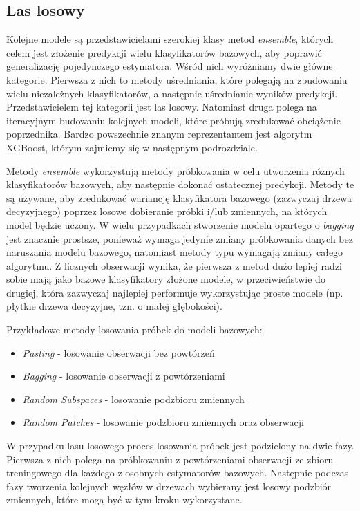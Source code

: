 \documentclass{book}
\begin{document}

\subsection{Las losowy}
	Kolejne modele są przedstawicielami szerokiej klasy metod \textit{ensemble}, których celem jest złożenie predykcji wielu klasyfikatorów bazowych, aby poprawić generalizację pojedynczego estymatora. Wśród nich wyróżniamy dwie główne kategorie. Pierwsza z nich to metody uśredniania, które polegają na zbudowaniu wielu niezależnych klasyfikatorów, a następnie uśrednianie wyników predykcji. Przedstawicielem tej kategorii jest las losowy. Natomiast druga polega na iteracyjnym budowaniu kolejnych modeli, które próbują zredukować obciążenie poprzednika. Bardzo powszechnie znanym reprezentantem jest algorytm XGBoost, którym zajmiemy się w następnym podrozdziale.
		
	Metody \textit{ensemble} wykorzystują metody próbkowania w celu utworzenia różnych klasyfikatorów bazowych, aby następnie dokonać ostatecznej predykcji. Metody te są używane, aby zredukować wariancję klasyfikatora bazowego (zazwyczaj drzewa decyzyjnego) poprzez losowe dobieranie próbki i/lub zmiennych, na których model będzie uczony. W wielu przypadkach stworzenie modelu opartego o \textit{bagging} jest znacznie prostsze, ponieważ wymaga jedynie zmiany próbkowania danych bez naruszania modelu bazowego, natomiast metody typu  wymagają zmiany całego algorytmu. Z licznych obserwacji wynika, że pierwsza z metod dużo lepiej radzi sobie mają jako bazowe klasyfikatory złożone modele, w przeciwieństwie do drugiej, która zazwyczaj najlepiej performuje wykorzystując proste modele (np. płytkie drzewa decyzyjne, tzn. o małej głębokości).
	
	
	Przykładowe metody losowania próbek do modeli bazowych:
	\begin{itemize}
		\item \textit{Pasting} - losowanie obserwacji bez powtórzeń
		\item \textit{Bagging} - losowanie obserwacji z powtórzeniami
		\item \textit{Random Subspaces} - losowanie podzbioru zmiennych
		\item \textit{Random Patches} - losowanie podzbioru zmiennych oraz obserwacji 
	\end{itemize}
	
	
	W przypadku lasu losowego proces losowania próbek jest podzielony na dwie fazy. Pierwsza z nich polega na próbkowaniu z powtórzeniami obserwacji ze zbioru treningowego dla każdego z osobnych estymatorów bazowych. Następnie podczas fazy tworzenia kolejnych węzłów w drzewach wybierany jest losowy podzbiór zmiennych, które mogą być w tym kroku wykorzystane. 
	
\end{document}
